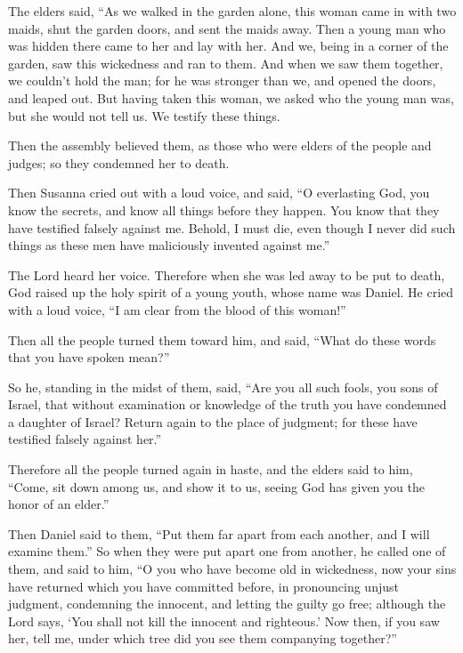  The elders said, ``As we walked in the garden alone,
this woman came in with two maids, shut the garden doors, and sent the
maids away.  Then a young man who was hidden there came
to her and lay with her.  And we, being in a corner of
the garden, saw this wickedness and ran to them.  And
when we saw them together, we couldn't hold the man; for he was stronger
than we, and opened the doors, and leaped out.  But
having taken this woman, we asked who the young man was, but she would
not tell us. We testify these things.

 Then the assembly believed them, as those who were
elders of the people and judges; so they condemned her to death.

 Then Susanna cried out with a loud voice, and said, ``O
everlasting God, you know the secrets, and know all things before they
happen.  You know that they have testified falsely
against me. Behold, I must die, even though I never did such things as
these men have maliciously invented against me.''

 The Lord heard her voice.  Therefore when
she was led away to be put to death, God raised up the holy spirit of a
young youth, whose name was Daniel.  He cried with a loud
voice, ``I am clear from the blood of this woman!''

 Then all the people turned them toward him, and said,
``What do these words that you have spoken mean?''

 So he, standing in the midst of them, said, ``Are you
all such fools, you sons of Israel, that without examination or
knowledge of the truth you have condemned a daughter of Israel?
 Return again to the place of judgment; for these have
testified falsely against her.''

 Therefore all the people turned again in haste, and the
elders said to him, ``Come, sit down among us, and show it to us, seeing
God has given you the honor of an elder.''

 Then Daniel said to them, ``Put them far apart from each
another, and I will examine them.''  So when they were
put apart one from another, he called one of them, and said to him, ``O
you who have become old in wickedness, now your sins have returned which
you have committed before,  in pronouncing unjust
judgment, condemning the innocent, and letting the guilty go free;
although the Lord says, `You shall not kill the innocent and righteous.'
 Now then, if you saw her, tell me, under which tree did
you see them companying together?''

